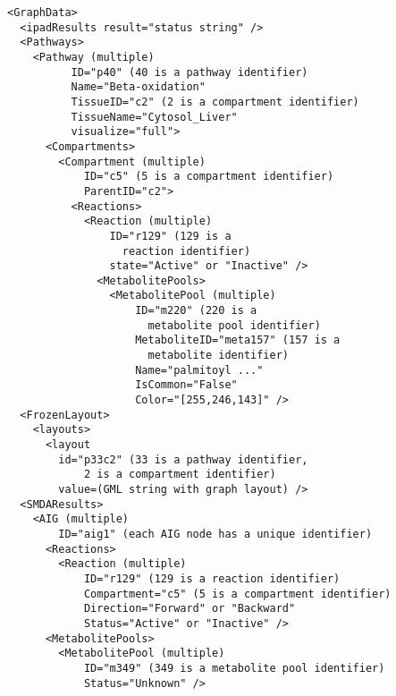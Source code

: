\begin{description}
    \begin{lstlisting}
<GraphData>
  <ipadResults result="status string" />
  <Pathways>
    <Pathway (multiple)
          ID="p40" (40 is a pathway identifier)
          Name="Beta-oxidation"
          TissueID="c2" (2 is a compartment identifier)
          TissueName="Cytosol_Liver"
          visualize="full">
      <Compartments>
        <Compartment (multiple)
            ID="c5" (5 is a compartment identifier)
            ParentID="c2">
          <Reactions>
            <Reaction (multiple)
                ID="r129" (129 is a
                  reaction identifier)
                state="Active" or "Inactive" />
              <MetabolitePools>
                <MetabolitePool (multiple)
                    ID="m220" (220 is a
                      metabolite pool identifier)
                    MetaboliteID="meta157" (157 is a
                      metabolite identifier)
                    Name="palmitoyl ..."
                    IsCommon="False"
                    Color="[255,246,143]" />
  <FrozenLayout>
    <layouts>
      <layout
        id="p33c2" (33 is a pathway identifier,
            2 is a compartment identifier)
        value=(GML string with graph layout) />
  <SMDAResults>
    <AIG (multiple)
        ID="aig1" (each AIG node has a unique identifier)
      <Reactions>
        <Reaction (multiple)
            ID="r129" (129 is a reaction identifier)
            Compartment="c5" (5 is a compartment identifier)
            Direction="Forward" or "Backward"
            Status="Active" or "Inactive" />
      <MetabolitePools>
        <MetabolitePool (multiple)
            ID="m349" (349 is a metabolite pool identifier)
            Status="Unknown" />
    \end{lstlisting}

\end{description}
